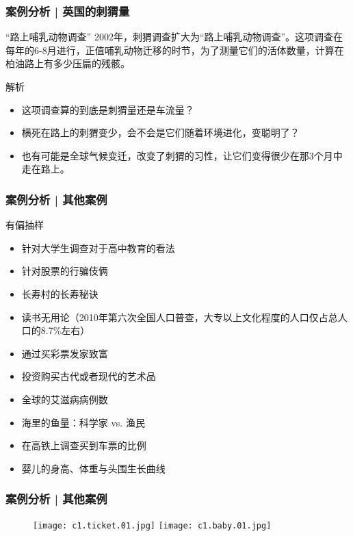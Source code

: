\begin{frame}
  \frametitle{案例分析 | 英国的刺猬量}
  \begin{block}{“路上哺乳动物调查”}
    2002年，刺猬调查扩大为“路上哺乳动物调查”。这项调查在每年的6-8月进行，正值哺乳动物迁移的时节，为了测量它们的活体数量，计算在柏油路上有多少压扁的残骸。
  \end{block}
  \pause
  \begin{block}{解析}
    \begin{itemize}
      \item 这项调查算的到底是刺猬量还是车流量？
      \item 横死在路上的刺猬变少，会不会是它们随着环境进化，变聪明了？
      \item 也有可能是全球气候变迁，改变了刺猬的习性，让它们变得很少在那3个月中走在路上。
    \end{itemize}
  \end{block}
\end{frame}

\begin{frame}
  \frametitle{案例分析 | 其他案例}
  \begin{block}{有偏抽样}
    \begin{itemize}
      \item 针对大学生调查对于高中教育的看法
      \item 针对股票的行骗伎俩
      \item 长寿村的长寿秘诀
      \item 读书无用论（2010年第六次全国人口普查，大专以上文化程度的人口仅占总人口的8.7\%左右）
      \item 通过买彩票发家致富
      \item 投资购买古代或者现代的艺术品
      \item 全球的艾滋病病例数
      \item 海里的鱼量：科学家 vs. 渔民
      \item 在高铁上调查买到车票的比例
      \item 婴儿的身高、体重与头围生长曲线
    \end{itemize}
  \end{block}
\end{frame}

\begin{frame}
  \frametitle{案例分析 | 其他案例}
    \begin{figure}
      \centering
      \texttt{[image: c1.ticket.01.jpg]}\quad
      \texttt{[image: c1.baby.01.jpg]}
    \end{figure}
\end{frame}

